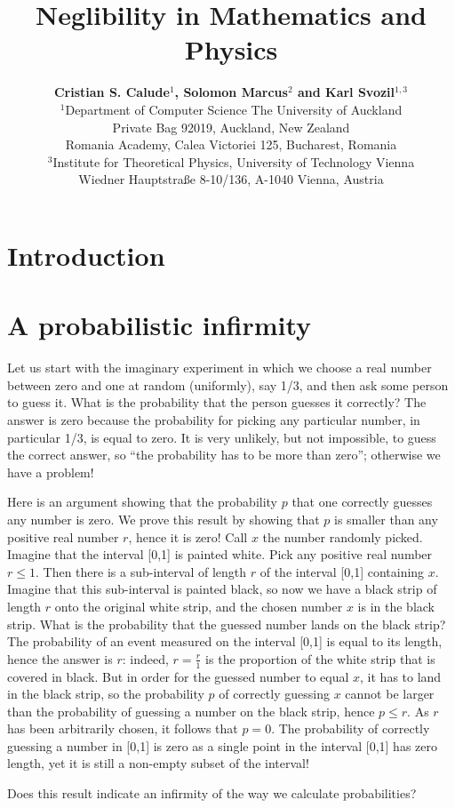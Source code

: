 \documentclass[11pt]{article}
\title{\bf Neglibility in Mathematics and Physics}
\author{{\bf Cristian S. Calude$^{1}$, Solomon Marcus$^{2}$ and Karl Svozil$^{1,3}$}\\[4ex]
$^{1}$Department of Computer Science The University of Auckland\\
Private Bag 92019, Auckland, New Zealand\\
Romania Academy, Calea Victoriei 125, Bucharest, Romania\\
$^{3}$Institute for Theoretical Physics, University of Technology Vienna\\
Wiedner Hauptstra\ss e 8-10/136, A-1040 Vienna, Austria}
\begin{document}
\maketitle
\thispagestyle{empty}
\section{Introduction}
\section{A probabilistic infirmity}

Let us  start with the imaginary experiment in which we  choose a real number between zero and one at random (uniformly),  say 1/3, and then ask some person to guess it.
What is the probability that the person guesses it correctly? The answer is zero because
the probability for picking any particular number, in particular 1/3,  is equal to zero. It is very unlikely, but not impossible,  to guess the correct answer, so   ``the probability has to be more than zero''; otherwise we have a problem!


Here is an argument showing  that the probability $p$ that one correctly guesses any number  is zero. We prove this result by showing  that $p$ is smaller than any positive real number $r$, hence it is zero!
Call  $x$ the number randomly picked. Imagine that the interval [0,1] is painted white. Pick any positive real number $r \le 1$. Then there is a sub-interval of length $r $ of the interval [0,1] containing $x$. Imagine that this sub-interval is painted black, so now we have a black strip of length $r $  onto the original white strip, and the chosen number  $x$  is in the black strip. What is the probability that the guessed number lands on the black strip? The probability of an event measured on the interval [0,1] is equal to its length, hence the answer is $r $: indeed,  $r=\frac{r}{1}$  is  the proportion of the white strip that is covered in black. But in order for the guessed number to equal  $x$, it has to land in the black strip, so the probability $p$ of correctly guessing $x$ cannot be larger than the probability of guessing a number on the black strip, hence $p \le r$. As $r$ has been  arbitrarily chosen, it follows that $p=0$. The probability of correctly guessing a number in [0,1]  is zero as a single point in the interval [0,1] has zero length,  yet it is  still a non-empty subset of the interval!

 Does this result indicate an infirmity of the way we calculate probabilities?
\end{document}
